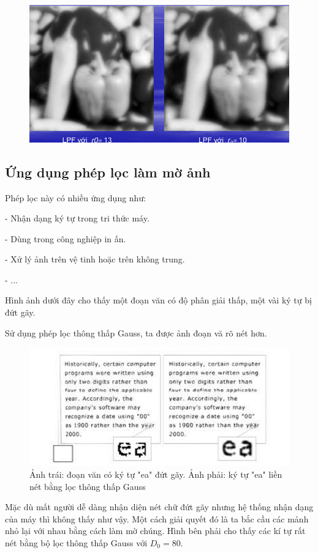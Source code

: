 \documentclass[12pt,a4paper]{report}
\numberwithin{equation}{section}
\theoremstyle{definition} %
\begin{document}
\begin{figure}[H]
\centering
\includegraphics[width=0.88\linewidth]{img/BLPF1.png}
\caption{}
\label{fig123}
\end{figure}


\subsection{Ứng dụng phép lọc làm mờ ảnh}

Phép lọc này có nhiều ứng dụng như:

- Nhận dạng ký tự trong tri thức máy.

- Dùng trong công nghiệp in ấn.

- Xử lý ảnh trên vệ tinh hoặc trên không trung.

- ...

Hình ảnh dưới đây cho thấy một đoạn văn có độ phân giải thấp, một vài ký tự bị đứt gãy. 

Sử dụng phép lọc thông thấp Gauss, ta được ảnh đoạn vă rõ nét hơn.
\begin{figure}[H]
	\centering
	\includegraphics[width=0.9\linewidth]{img/ungdungmoanh1.png}
	\caption{Ảnh trái:  đoạn văn có ký tự "ea" đứt gãy. Ảnh phải: ký tự "ea" liền nét bằng lọc thông thấp Gauss}
	\label{fig124}
\end{figure}
Mặc dù mất người dễ dàng nhận diện nét chữ đứt gãy nhưng hệ thống nhận dạng của máy thì không thấy như vậy. Một cách giải quyết đó là ta bắc cầu các mảnh nhỏ lại với nhau bằng cách làm mờ chúng. Hình bên phải cho thấy các kí tự rất nét bằng bộ lọc thông thấp Gauss với $D_0 = 80$.
\end{document}
